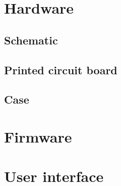 \section{Hardware}
\subsection{Schematic}


\subsection{Printed circuit board}


\subsection{Case}


\section{Firmware}


\section{User interface}
